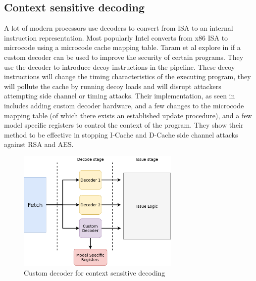 \subsection{Context sensitive decoding}

A lot of modern processors use decoders to convert from ISA to an internal instruction
representation. Most popularly Intel converts from x86 ISA to microcode using a microcode cache mapping table.
Taram et al explore in  if a custom decoder can be used to improve the security of certain programs.
They use the decoder to introduce decoy instructions in the pipeline. These decoy instructions will change the timing
characteristics of the executing program, they will pollute the cache by running decoy loads and will disrupt
attackers attempting side channel or timing attacks. Their implementation, as seen in  includes adding custom decoder hardware,
and a few changes to the microcode mapping table (of which there exists an established update procedure), and a
few model specific registers to control the context of the program.
They show their method to be effective in stopping I-Cache and D-Cache side channel attacks against RSA and AES.

\begin{figure}
    \centering
    \includegraphics[width=0.7\textwidth]{csd}
    \caption{Custom decoder for context sensitive decoding}
    \label{fig:csd}
\end{figure}

